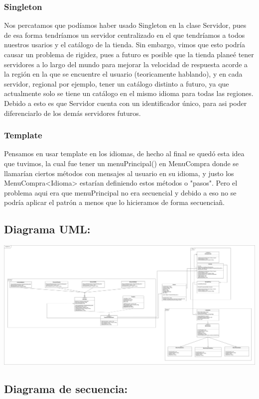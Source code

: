 \documentclass{article}
\begin{document}
\subsubsection*{Singleton}
Nos percatamos que podíamos haber usado Singleton en la clase Servidor, pues de esa forma
tendríamos un servidor centralizado en el que tendríamos a todos nuestros usarios y el catálogo
de la tienda. Sin embargo, vimos que esto podría causar un problema de rigidez, pues a futuro
es posible que la tienda planeé tener servidores a lo largo del mundo para mejorar la velocidad
de respuesta acorde a la región en la que se encuentre el usuario (teoricamente hablando), y
en cada servidor, regional por ejemplo, tener un catálogo distinto a futuro, ya que actualmente
solo se tiene un catálogo en el mismo idioma para todas las regiones. Debido a esto es que
Servidor cuenta con un identificador único, para asi poder diferenciarlo de los demás servidores
futuros.

\subsubsection*{Template}
Pensamos en usar template en los idiomas, de hecho al final se quedó esta idea que tuvimos, la cual fue tener un menuPrincipal() en MenuCompra donde se llamarían ciertos métodos con mensajes al usuario en su idioma, y justo los MenuCompra<Idioma> estarían definiendo estos métodos o "pasos". Pero el problema aqui era que menuPrincipal no era secuencial y debido a eso no se podría aplicar el patrón a menos que lo hicieramos de forma secuenciañ.

\newpage
\subsection*{Diagrama UML:}
\begin{center}
  \includegraphics[scale=0.12]{./Proyecto01UML.jpg}
\end{center}

\subsection*{Diagrama de secuencia:}
\end{document}
